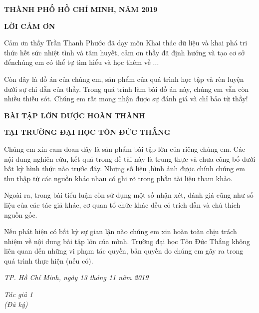 \documentclass{report}
\begin{document}
\vspace{1.5cm}
\changefontsizes{14pt}
\centerline{\textbf{THÀNH PHỐ HỒ CHÍ MINH, NĂM 2019}}



\newpage
\changefontsizes{16pt}
\centerline{\textbf{LỜI CẢM ƠN}}

\changefontsizes{13pt}
\bigskip
\setlength{\parindent}{2cm}


Cảm ơn thầy Trần Thanh Phước đã dạy môn Khai thác dữ liệu và khai phá tri thức hết sức nhiệt tình và tâm huyết, cảm ơn thầy đã định hướng và tạo cơ sở đểnchúng em có thể tự tìm hiểu và học thêm về ...

Còn đây là đồ án của chúng em, sản phẩm của quá trình học tập và rèn luyện dưới sự chỉ dẫn của thầy. Trong quá trình làm bài đồ án này, chúng em vẫn còn nhiều thiếu sót. Chúng em rất mong nhận được sự đánh giá và chỉ bảo từ thầy!
    
\newpage
\changefontsizes{16pt}
\centerline{\textbf{BÀI TẬP LỚN ĐƯỢC HOÀN THÀNH}}
\centerline{\textbf{TẠI TRƯỜNG ĐẠI HỌC TÔN ĐỨC THẮNG}}
\changefontsizes{13pt}
\vspace{1cm}
\setlength{\parindent}{2cm}
Chúng em xin cam đoan đây là sản phẩm bài tập lớn của riêng chúng em. Các nội dung nghiên cứu, kết quả trong đề tài này là trung thực và chưa công bố dưới bất kỳ hình thức nào trước đây. Những số liệu ,hình ảnh được chính chúng em thu thập từ các nguồn khác nhau có ghi rõ trong phần tài liệu tham khảo.

\setlength{\parindent}{2cm}
Ngoài ra, trong bài tiểu luận còn sử dụng một số nhận xét, đánh giá cũng như số liệu của các tác giả khác, cơ quan tổ chức khác đều có trích dẫn và chú thích nguồn gốc.

\setlength{\parindent}{2cm}
Nếu phát hiện có bất kỳ sự gian lận nào chúng em xin hoàn toàn chịu trách nhiệm về nội dung bài tập lớn của mình. Trường đại học Tôn Đức Thắng không liên quan đến những vi phạm tác quyền, bản quyền do chúng em gây ra trong quá trình thực hiện (nếu có).

\vspace{0.75cm}
\begin{flushright}
\renewcommand{\baselinestretch}{0.05}
\changefontsizes{13pt}
\textit{TP. Hồ Chí Minh, ngày 13 tháng 11 năm 2019}
\end{flushright}

\setlength{\parindent}{12.5cm}
\textit{Tác giả 1}\\

\setlength{\parindent}{12.5cm}
\textit{(Đã ký)}\\
\end{document}
